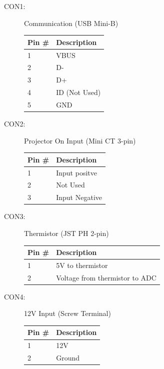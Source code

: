 \documentclass{article}
\begin{document}
\begin{description}
  \item[CON1:] Communication (USB Mini-B) \\
    \begin{center}
        \begin{tabular}{l|l}
            Pin \# & Description \\
            \hline
            1 & VBUS \\
            2 & D- \\
            3 & D+ \\
            4 & ID (Not Used) \\
            5 & GND \\
        \end{tabular}
    \end{center}
  \item[CON2:] Projector On Input (Mini CT 3-pin) \\
    \begin{center}
        \begin{tabular}{l|l}
            Pin \# & Description \\
            \hline
            1 & Input positve \\
            2 & Not Used \\
            3 & Input Negative \\
        \end{tabular}
    \end{center}
  \item[CON3:] Thermistor (JST PH 2-pin) \\
    \begin{center}
        \begin{tabular}{l|l}
            Pin \# & Description \\
            \hline
            1 & 5V to thermistor \\
            2 & Voltage from thermistor to ADC \\
        \end{tabular}
    \end{center}
  \item[CON4:] 12V Input (Screw Terminal) \\
    \begin{center}
        \begin{tabular}{l|l}
            Pin \# & Description \\
            \hline
            1 & 12V \\
            2 & Ground \\

\end{tabular}
\end{center}
\end{description}
\end{document}
